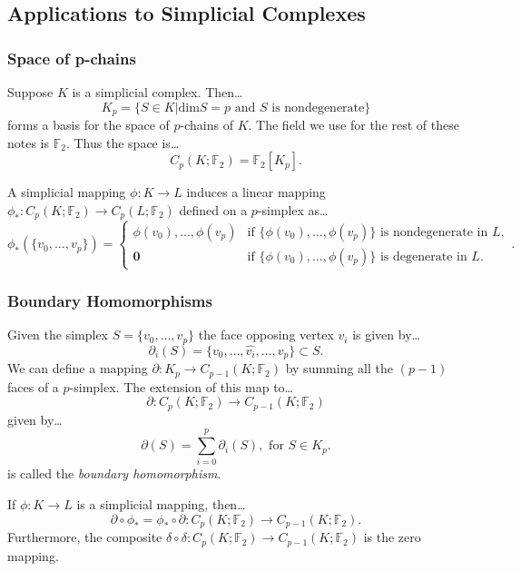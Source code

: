 \subsection{Applications to Simplicial Complexes}\label{simplicialhomology}

\subsubsection{Space of p-chains}\label{pchains}
Suppose $K$ is a simplicial complex. Then\dots
$$K_p = \{ S \in K | \textrm{dim} S = p \textrm{ and } S \textrm{ is nondegenerate} \}$$
forms a basis for the space of $p$-chains of $K$. The field we use for the rest of these notes is $\mathbb{F}_2$.
Thus the space is\dots
$$C_p(K; \mathbb{F}_2) = \mathbb{F}_2[K_p].$$

\noindent A simplicial mapping $\phi : K \rightarrow L$ induces a linear mapping $\phi_* : C_p(K; \mathbb{F}_2) \rightarrow C_p(L; \mathbb{F}_2)$
defined on a $p$-simplex as\dots
\[
\phi_*(\{v_0,\dots,v_p\}) = \begin{cases}
                                \phi(v_0),\dots,\phi(v_p) & \textrm{if } \{ \phi(v_0), \dots, \phi(v_p) \} \textrm{ is nondegenerate in } L,\\
                                \textbf{0} & \textrm{if } \{ \phi(v_0), \dots, \phi(v_p) \} \textrm{ is degenerate in } L.
                            \end{cases}.
\]

\subsubsection{Boundary Homomorphisms}\label{boundaryhomomorphism}
Given the simplex $S = \{ v_0, \dots, v_p \}$ the face opposing vertex $v_i$ is given by\dots
$$\partial_i(S) = \{ v_0, \dots, \hat{v_i}, \dots, v_p \} \subset S.$$
We can define a mapping $\partial : K_p \rightarrow C_{p-1}(K; \mathbb{F}_2)$ by summing all the $(p-1)$
faces of a $p$-simplex. The extension of this map to\dots
$$\partial : C_{p}(K; \mathbb{F}_2) \rightarrow C_{p-1}(K; \mathbb{F}_2)$$
given by\dots
$$\partial(S) = \sum_{i=0}^p \partial_i(S), \textrm{ for } S \in K_p.$$
is called the \emph{boundary homomorphism}.

\begin{proposition}
If $\phi : K \rightarrow L$ is a simplicial mapping, then\dots
$$\partial \circ \phi_* = \phi_* \circ \partial : C_{p}(K; \mathbb{F}_2) \rightarrow C_{p-1}(K; \mathbb{F}_2).$$
Furthermore, the composite $\delta \circ \delta : C_p(K; \mathbb{F}_2) \rightarrow C_{p-1}(K; \mathbb{F}_2)$ is
the zero mapping.
\end{proposition}
